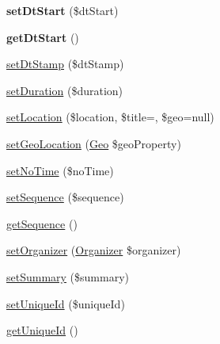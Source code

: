 \begin{DoxyCompactItemize}
\item 
\mbox{\label{class_eluceo_1_1i_cal_1_1_component_1_1_event_a4a0ac3f8c1c18435b67c7be2474c0ed1}} 
{\bfseries set\+Dt\+Start} (\$dt\+Start)
\item 
\mbox{\label{class_eluceo_1_1i_cal_1_1_component_1_1_event_a68e770ea9835241b33a10b5833edf50e}} 
{\bfseries get\+Dt\+Start} ()
\item 
\mbox{\hyperlink{class_eluceo_1_1i_cal_1_1_component_1_1_event_a395b6bc368752cb4f2dbe0fac3b4bc8f}{set\+Dt\+Stamp}} (\$dt\+Stamp)
\item 
\mbox{\hyperlink{class_eluceo_1_1i_cal_1_1_component_1_1_event_aaa4ee424e98d66778e0af4c7c0e4994f}{set\+Duration}} (\$duration)
\item 
\mbox{\hyperlink{class_eluceo_1_1i_cal_1_1_component_1_1_event_a44f4216a540e32fe3d18015e24bc40b5}{set\+Location}} (\$location, \$title=\textquotesingle{}\textquotesingle{}, \$geo=null)
\item 
\mbox{\hyperlink{class_eluceo_1_1i_cal_1_1_component_1_1_event_a7dcac1158135e60a3dd6422ec8c480c3}{set\+Geo\+Location}} (\mbox{\hyperlink{class_eluceo_1_1i_cal_1_1_property_1_1_event_1_1_geo}{Geo}} \$geo\+Property)
\item 
\mbox{\hyperlink{class_eluceo_1_1i_cal_1_1_component_1_1_event_a313bef4a402da42f644ac0dc3bafe586}{set\+No\+Time}} (\$no\+Time)
\item 
\mbox{\hyperlink{class_eluceo_1_1i_cal_1_1_component_1_1_event_a87725eac37817e617abbe6d1910790e9}{set\+Sequence}} (\$sequence)
\item 
\mbox{\hyperlink{class_eluceo_1_1i_cal_1_1_component_1_1_event_a5fd79e07365d5e382196df5dc0cf6f16}{get\+Sequence}} ()
\item 
\mbox{\hyperlink{class_eluceo_1_1i_cal_1_1_component_1_1_event_a62d9b8061a582bb16162bea9d5ddbb40}{set\+Organizer}} (\mbox{\hyperlink{class_eluceo_1_1i_cal_1_1_property_1_1_event_1_1_organizer}{Organizer}} \$organizer)
\item 
\mbox{\hyperlink{class_eluceo_1_1i_cal_1_1_component_1_1_event_ad632fd01f9c5094a1e705c21fc1dddf1}{set\+Summary}} (\$summary)
\item 
\mbox{\hyperlink{class_eluceo_1_1i_cal_1_1_component_1_1_event_ad71076351bbd5720b266b021d92d61cc}{set\+Unique\+Id}} (\$unique\+Id)
\item 
\mbox{\hyperlink{class_eluceo_1_1i_cal_1_1_component_1_1_event_aeb367010876c6f9a015f86e392512da0}{get\+Unique\+Id}} ()

\end{DoxyCompactItemize}
